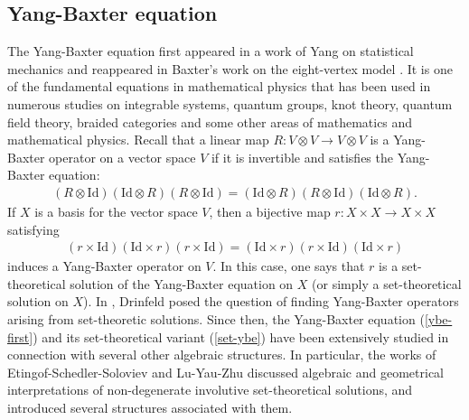 \documentclass[a4paper,reqno,10pt]{amsart}
\theoremstyle{plain}
\theoremstyle{definition}
\theoremstyle{remark}
\begin{document}
\subsection{Yang-Baxter equation}
The Yang-Baxter equation first appeared in a work of Yang on statistical mechanics \cite{yang} and reappeared in Baxter's work on the eight-vertex model \cite{baxter}. It is one of the fundamental equations in mathematical physics that has been used in numerous studies on integrable systems, quantum groups, knot theory, quantum field theory, braided categories and some other areas of mathematics and mathematical physics. Recall that a linear map $R: V \otimes V\rightarrow  V\otimes V$ is a Yang-Baxter operator on a vector space $V$ if it is invertible and satisfies the Yang-Baxter equation:
\begin{align}\label{ybe-first}
    (R \otimes \mathrm{Id}) (\mathrm{Id} \otimes R) (R \otimes \mathrm{Id}) = (\mathrm{Id} \otimes R) (R \otimes \mathrm{Id}) (\mathrm{Id} \otimes R).
\end{align}
If $X$ is a basis for the vector space $V$, then a bijective map $r : X \times X \rightarrow X \times X$ satisfying
\begin{align}\label{set-ybe}
    (r \times \mathrm{Id}) (\mathrm{Id} \times r) (r \times \mathrm{Id}) =  (\mathrm{Id} \times r)  (r \times \mathrm{Id}) (\mathrm{Id} \times r)
\end{align}
induces a Yang-Baxter operator on $V$. In this case, one says that $r$ is a set-theoretical solution of the Yang-Baxter equation on $X$ (or simply a set-theoretical solution on $X$). In \cite{drinfeld}, Drinfeld posed the question of finding Yang-Baxter operators arising from set-theoretic solutions. Since then, the Yang-Baxter equation (\ref{ybe-first}) and its set-theoretical variant (\ref{set-ybe}) have been extensively studied in connection with several other algebraic structures. In particular, the works of Etingof-Schedler-Soloviev \cite{etingof} and Lu-Yau-Zhu \cite{lu} discussed algebraic and geometrical interpretations of non-degenerate involutive set-theoretical solutions, and introduced several structures associated with them.


\medskip
\end{document}
